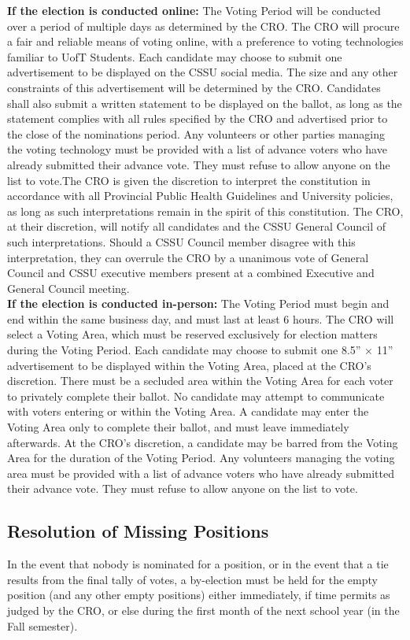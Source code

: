 \documentclass{article}
\begin{document}
\textbf{If the election is conducted online:}
The Voting Period will be conducted over a period of multiple days as determined by the
CRO.
The CRO will procure a fair and reliable means of voting online, with a preference to voting
technologies familiar to UofT Students.
Each candidate may choose to submit one advertisement to be displayed on the CSSU
social media. The size and any other constraints of this advertisement will be determined by
the CRO. Candidates shall also submit a written statement to be displayed on the ballot, as
long as the statement complies with all rules specified by the CRO and advertised prior to
the close of the nominations period.
Any volunteers or other parties managing the voting technology must be provided with a list
of advance voters who have already submitted their advance vote. They must refuse to
allow anyone on the list to vote.The CRO is given the discretion to interpret the constitution in accordance with all Provincial
Public Health Guidelines and University policies, as long as such interpretations remain in
the spirit of this constitution. The CRO, at their discretion, will notify all candidates and the
CSSU General Council of such interpretations. Should a CSSU Council member disagree
with this interpretation, they can overrule the CRO by a unanimous vote of General Council
and CSSU executive members present at a combined Executive and General Council
meeting.\\

\textbf{If the election is conducted in-person:}
The Voting Period must begin and end within the same business day, and must last at least 6
hours.
The CRO will select a Voting Area, which must be reserved exclusively for election matters
during the Voting Period.
Each candidate may choose to submit one 8.5” × 11” advertisement to be displayed within the
Voting Area, placed at the CRO’s discretion. There must be a secluded area within the Voting
Area for each voter to privately complete their ballot.
No candidate may attempt to communicate with voters entering or within the Voting Area. A
candidate may enter the Voting Area only to complete their ballot, and must leave
immediately afterwards. At the CRO’s discretion, a candidate may be barred from the Voting
Area for the duration of the Voting Period.
Any volunteers managing the voting area must be provided with a list of advance voters who
have already submitted their advance vote. They must refuse to allow anyone on the list to vote.
\subsection{Resolution of Missing Positions} \label{sec:3.8}
In the event that nobody is nominated for a position, or in the event that a tie results from the
final tally of votes, a by-election must be held for the empty position (and any other empty
positions) either immediately, if time permits as judged by the CRO, or else during the first
month of the next school year (in the Fall semester).
\end{document}
